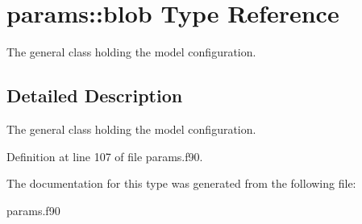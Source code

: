 \hypertarget{structparams_1_1blob}{}\section{params\+:\+:blob Type Reference}
\label{structparams_1_1blob}


The general class holding the model configuration.  




\subsection{Detailed Description}
The general class holding the model configuration. 

Definition at line 107 of file params.\+f90.



The documentation for this type was generated from the following file\+:\begin{DoxyCompactItemize}
\item 
params.\+f90\end{DoxyCompactItemize}
